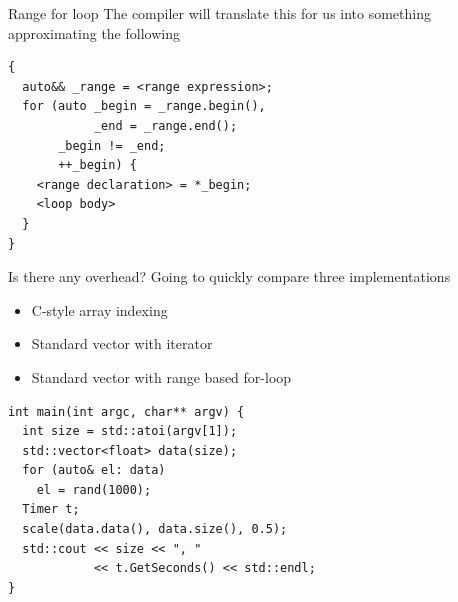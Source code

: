 \documentclass[presentation,t]{beamer}
\begin{document}
\begin{frame}[fragile]{Range for loop}
  The compiler will translate this for us into something approximating
  the following
\begin{lstlisting}
{
  auto&& _range = <range expression>; 
  for (auto _begin = _range.begin(),
            _end = _range.end();
       _begin != _end;
       ++_begin) { 
    <range declaration> = *_begin;
    <loop body> 
  }
}
\end{lstlisting}
\end{frame}

\begin{frame}[fragile]{Is there any overhead?}
  Going to quickly compare three implementations
  \begin{itemize}
  \item C-style array indexing
  \item Standard vector with iterator 
  \item Standard vector with range based for-loop
  \end{itemize}

\begin{lstlisting}
int main(int argc, char** argv) {
  int size = std::atoi(argv[1]);
  std::vector<float> data(size);
  for (auto& el: data)
    el = rand(1000);
  Timer t;
  scale(data.data(), data.size(), 0.5);
  std::cout << size << ", " 
            << t.GetSeconds() << std::endl;
}
\end{lstlisting}
\end{frame}
\end{document}
